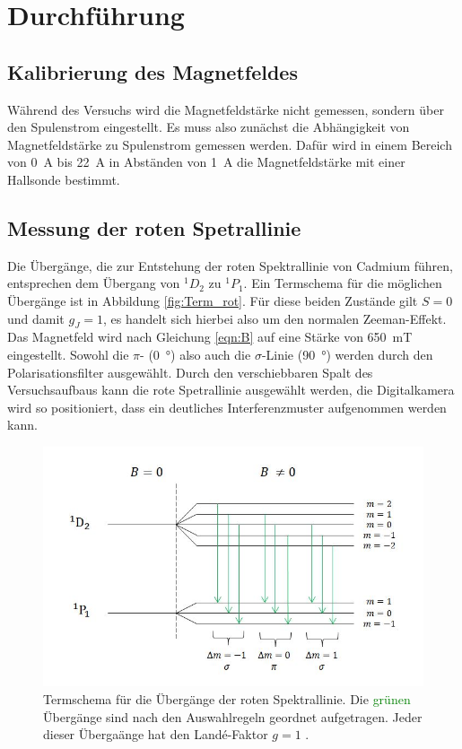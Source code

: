 \section{Durchführung}
\subsection{Kalibrierung des Magnetfeldes}
Während des Versuchs wird die Magnetfeldstärke nicht gemessen, sondern über den Spulenstrom eingestellt.
Es muss also zunächst die Abhängigkeit von Magnetfeldstärke zu Spulenstrom gemessen werden.
Dafür wird in einem Bereich von \SI{0}{\ampere} bis \SI{22}{\ampere} in Abständen von \SI{1}{\ampere} die Magnetfeldstärke mit einer Hallsonde bestimmt.

\subsection{Messung der roten Spetrallinie}

Die Übergänge, die zur Entstehung der roten Spektrallinie von Cadmium führen, entsprechen dem Übergang von $^1D_2$ zu $^1P_1$.
Ein Termschema für die möglichen Übergänge ist in Abbildung \ref{fig:Term_rot}.
Für diese beiden Zustände gilt $S=0$ und damit $g_J = 1$, es handelt sich hierbei also um den normalen Zeeman-Effekt.
Das Magnetfeld wird nach Gleichung \eqref{eqn:B} auf eine Stärke von \SI{650}{\milli\tesla} eingestellt.
Sowohl die $\pi$- (\SI{0}{\degree}) also auch die $\sigma$-Linie (\SI{90}{\degree}) werden durch den Polarisationsfilter ausgewählt.
Durch den verschiebbaren Spalt des Versuchsaufbaus kann die rote Spetrallinie ausgewählt werden, die Digitalkamera wird so positioniert, dass ein deutliches Interferenzmuster aufgenommen werden kann.

\begin{figure}[H]
  \centering
  \includegraphics[width = .6\textwidth]{images/termschema_rot.jpg}
  \caption{Termschema für die Übergänge der roten Spektrallinie. Die \textcolor{green}{grünen} Übergänge sind nach den Auswahlregeln geordnet aufgetragen. Jeder dieser Übergaänge hat den Landé-Faktor $g=1$ \cite{Janina}.}
  \label{fig:Term_rot.}
\end{figure}

